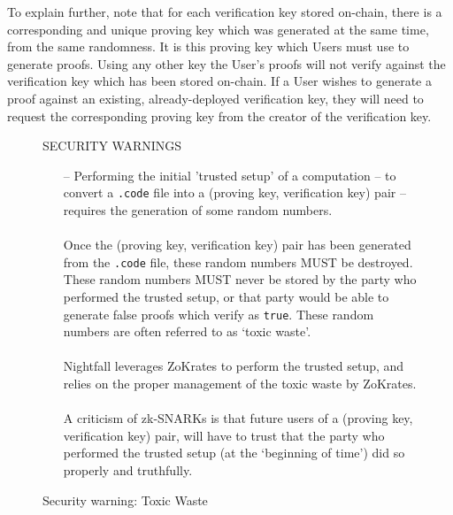 To explain further, note that for each verification key stored on-chain, there is a corresponding and unique proving key which was generated at the same time, from the same randomness. It is this proving key which Users must use to generate proofs.
Using any other key the User's proofs will not verify against the verification key which has been stored on-chain.
If a User wishes to generate a proof against an existing, already-deployed verification key, they will need to request the corresponding proving key from the creator of the verification key.

\begin{figure}[H]
  \begin{center}
    \begin{mdframed}[backgroundcolor=verylightred]
      \noindent
      SECURITY WARNINGS 
        \begin{itemize}
          \item[--] Performing the initial 'trusted setup' of a computation -- to convert a \texttt{.code} file into a (proving key, verification key) pair -- requires the generation of some random numbers.\\
          \\
          Once the (proving key, verification key) pair has been generated from the \texttt{.code} file, these random numbers MUST be destroyed. These random numbers MUST never be stored by the party who performed the trusted setup, or that party would be able to generate false proofs which verify as \texttt{true}. These random numbers are often referred to as `toxic waste'.\\
          \\
          Nightfall leverages ZoKrates to perform the trusted setup, and relies on the proper management of the toxic waste by ZoKrates.\\
          \\
          A criticism of zk-SNARKs is that future users of a (proving key, verification key) pair, will have to trust that the party who performed the trusted setup (at the `beginning of time') did so properly and truthfully. 
        \end{itemize} 
    \end{mdframed} 
  \end{center}
  \caption{Security warning: Toxic Waste}
  \label{fig:trustedSetupWarning}
\end{figure}


